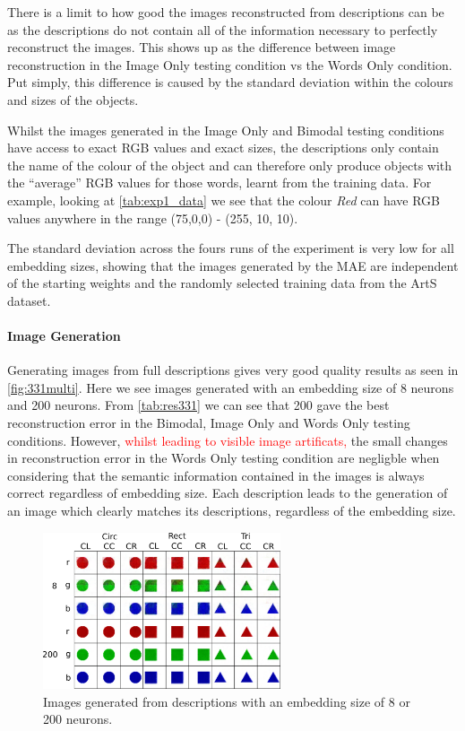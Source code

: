 There is a limit to how good the images reconstructed from descriptions can be as the descriptions do not contain all of the information necessary to perfectly reconstruct the images. This shows up as the difference between image reconstruction in the Image Only testing condition vs the Words Only condition. Put simply, this difference is caused by the standard deviation within the colours and sizes of the objects. 

Whilst the images generated in the Image Only and Bimodal testing conditions have access to exact \ac{RGB} values and exact sizes, the descriptions only contain the name of the colour of the object and can therefore only produce objects with the ``average'' \ac{RGB} values for those words, learnt from the training data. For example, looking at \autoref{tab:exp1_data} we see that the colour \textit{Red} can have RGB values anywhere in the range (75,0,0) - (255, 10, 10).

The standard deviation across the fours runs of the experiment is very low for all embedding sizes, showing that the images generated by the \ac{MAE} are independent of the starting weights and the randomly selected training data from the ArtS dataset. 

\paragraph{Image Generation}

Generating images from full descriptions gives very good quality results as seen in \autoref{fig:331multi}. Here we see images generated with an embedding size of 8 neurons and 200 neurons. From \autoref{tab:res331} we can see that 200 gave the best reconstruction error in the Bimodal, Image Only and Words Only testing conditions. However, \textcolor{red}{whilst leading to visible image artificats,} the small changes in reconstruction error in the Words Only testing condition are negligble when considering that the semantic information contained in the images is always correct regardless of embedding size. Each description leads to the generation of an image which clearly matches its descriptions, regardless of the embedding size. 

\begin{figure}
\centering
\includegraphics[width=0.625\textwidth]{Figs/shapes/331_8v200.png}
\caption{Images generated from descriptions with an embedding size of 8 or 200 neurons.}
\label{fig:331multi}
\end{figure}

